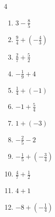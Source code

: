 \begin{multicols}{4}
\begin{enumerate}
  \item $\displaystyle 3 - \frac{8}{5}$


  \item $\displaystyle \frac{9}{4} + \left(-\frac{4}{3}\right)$


  \item $\displaystyle \frac{2}{7} + \frac{5}{2}$


\columnbreak %

\resetques

  \item $\displaystyle -\frac{1}{9} + 4$


  \item $\displaystyle \frac{1}{4} + \left(-1\right)$


  \item $\displaystyle -1 + \frac{5}{4}$


  \item $\displaystyle 1 + \left(-3\right)$

        \phantom{$\displaystyle =-2$}

  \item $\displaystyle -\frac{2}{5} - 2$


  \item $\displaystyle -\frac{1}{5} + \left(-\frac{3}{4}\right)$


  \item $\displaystyle \frac{4}{7} + \frac{1}{2}$


  \item $\displaystyle 4 + 1$

        \phantom{$\displaystyle =5$}

  \item $\displaystyle -8 + \left(-\frac{1}{4}\right)$


\end{enumerate}
\end{multicols}
